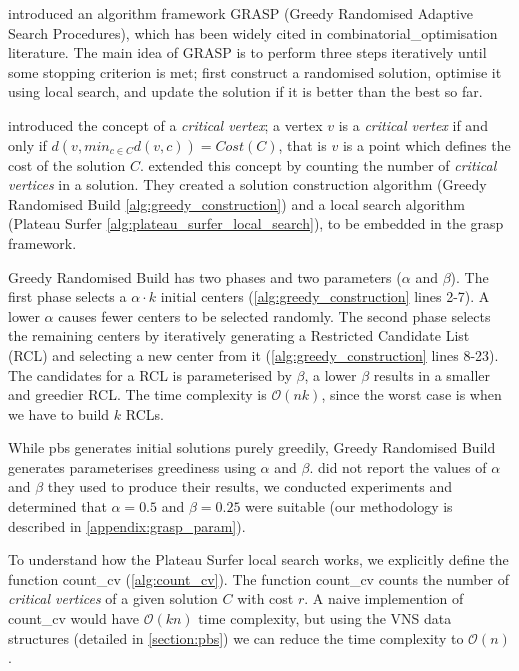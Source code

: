 \textcite{feo_greedy_1995} introduced an algorithm framework GRASP (Greedy Randomised Adaptive Search Procedures), which has been widely cited in \gls{combinatorial_optimisation} literature. The main idea of GRASP is to perform three steps iteratively until some stopping criterion is met; first construct a randomised solution, optimise it using local search, and update the solution if it is better than the best so far.



\textcite{mladenovic_solving_2003} introduced the concept of a \emph{critical vertex}; a vertex $v$ is a \emph{critical vertex} if and only if $d(v, min_{c\in C}d(v, c))=Cost(C)$, that is $v$ is a point which defines the cost of the solution $C$. \textcite{battiti_new_2017} extended this concept by counting the number of \emph{critical vertices} in a solution. They created a solution construction algorithm (Greedy Randomised Build \cref{alg:greedy_construction}) and a local search algorithm (Plateau Surfer \cref{alg:plateau_surfer_local_search}), to be embedded in the \acrshort{grasp} framework.

Greedy Randomised Build has two phases and two parameters ($\alpha$ and $\beta$). The first phase selects a $\alpha\cdot k$ initial centers (\cref{alg:greedy_construction} lines 2-7). A lower $\alpha$ causes fewer centers to be selected randomly. The second phase selects the remaining centers by iteratively generating a Restricted Candidate List (RCL) and selecting a new center from it (\cref{alg:greedy_construction} lines 8-23). The candidates for a RCL is parameterised by $\beta$, a lower $\beta$ results in a smaller and greedier RCL. The time complexity is $\mathcal{O}(nk)$, since the worst case is when we have to build $k$ RCLs. 

While \acrshort{pbs} generates initial solutions purely greedily, Greedy Randomised Build generates parameterises greediness using $\alpha$ and $\beta$. \textcite{battiti_new_2017} did not report the values of $\alpha$ and $\beta$ they used to produce their results, we conducted experiments and determined that $\alpha =0.5$ and $\beta =0.25$ were suitable (our methodology is described in \cref{appendix:grasp_param}).



To understand how the Plateau Surfer local search works, we explicitly define the function count\_cv (\cref{alg:count_cv}). The function count\_cv counts the number of \emph{critical vertices} of a given solution $C$ with cost $r$. A naive implemention of count\_cv would have $\mathcal{O}(kn)$ time complexity, but using the VNS data structures (detailed in \cref{section:pbs}) we can reduce the time complexity to $\mathcal{O}(n)$ . 

